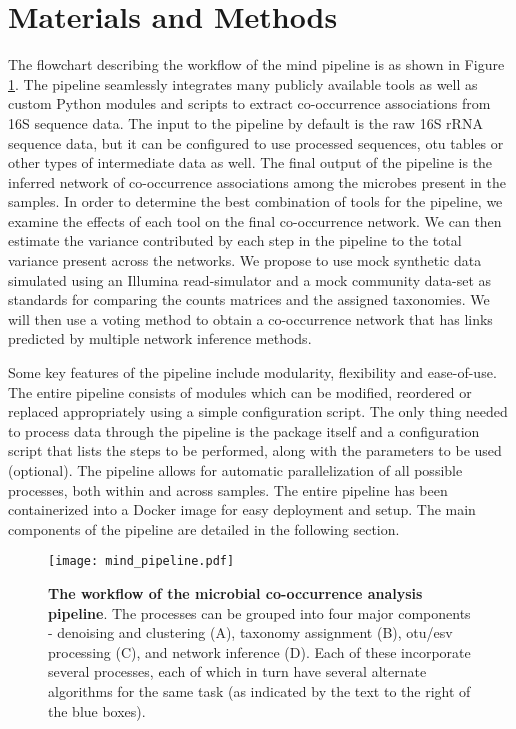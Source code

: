 
\section*{Materials and Methods}

  The flowchart describing the workflow of the \ac{mind} pipeline is as shown in Figure \ref{fig:mind_pipeline}.
  The pipeline seamlessly integrates many publicly available tools as well as custom Python modules and scripts to extract co-occurrence associations from 16S sequence data.
  The input to the pipeline by default is the raw 16S rRNA sequence data, but it can be configured to use processed sequences, \ac{otu} tables or other types of intermediate data as well.
  The final output of the pipeline is the inferred network of co-occurrence associations among the microbes present in the samples.
  In order to determine the best combination of tools for the pipeline, we examine the effects of each tool on the final co-occurrence network.
  We can then estimate the variance contributed by each step in the pipeline to the total variance present across the networks.
  We propose to use mock synthetic data simulated using an Illumina read-simulator \cite{Escalona2016} and a mock community data-set \cite{Bokulich2016} as standards for comparing the counts matrices and the assigned taxonomies.
  We will then use a voting method to obtain a co-occurrence network that has links predicted by multiple network inference methods.

  Some key features of the pipeline include modularity, flexibility and ease-of-use.
  The entire pipeline consists of modules which can be modified, reordered or replaced appropriately using a simple configuration script.
  The only thing needed to process data through the pipeline is the package itself and a configuration script that lists the steps to be performed, along with the parameters to be used (optional).
  The pipeline allows for automatic parallelization of all possible processes, both within and across samples.
  The entire pipeline has been containerized into a Docker \cite{Merkel1994} image for easy deployment and setup.
  The main components of the pipeline are detailed in the following section.

  \begin{figure}[h]
    \centering
    \texttt{[image: mind\_pipeline.pdf]}
    \caption{
      \textbf{The workflow of the microbial co-occurrence analysis pipeline}.
        The processes can be grouped into four major components - denoising and clustering (A), taxonomy assignment (B), \ac{otu}/\ac{esv} processing (C), and network inference (D).
        Each of these incorporate several processes, each of which in turn have several alternate algorithms for the same task (as indicated by the text to the right of the blue boxes).
    }
    \label{fig:mind_pipeline}
  \end{figure}

